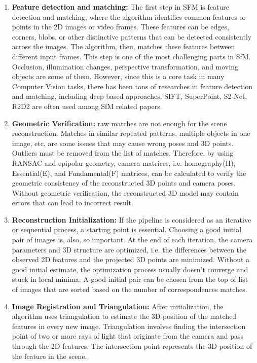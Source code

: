\documentclass[11pt]{article}
\begin{document}
    \begin{enumerate}
        \item \textbf{Feature detection and matching:} The first step in SFM is feature detection and matching, where
        the algorithm identifies common features or points in the 2D images or video frames. These features
        can be edges, corners, blobs, or other distinctive patterns that can be detected consistently across
        the images. The algorithm, then, matches these features between different input frames. This step is one
        of the most challenging parts in SfM. Occlusion, illumination changes, perspective transformation, and moving objects
        are some of them. However, since this is a core task in many Computer Vision tasks, there has been
        tons of researches in feature detection and matching, including deep based approaches. SIFT, SuperPoint,
        S2-Net, R2D2 are often used among SfM related papers.

        \item \textbf{Geometric Verification:} raw matches are not enough for the scene reconstruction.
        Matches in similar repeated patterns, multiple objects in one image, etc, are some issues that may cause wrong
        poses and 3D points. Outliers must be removed from the list of matches. Therefore, by using RANSAC and epipolar
        geometry, camera matrices, i.e. homography(H), Essential(E), and Fundamental(F) matrices, can be calculated
        to verify the geometric consistency of the reconstructed 3D points and camera poses.
        Without geometric verification, the reconstructed 3D model may contain errors that can lead to incorrect result.

        \item \textbf{Reconstruction Initialization:} If the pipeline is considered as an iterative or sequential process,
        a starting point is essential. Choosing a good initial pair of images is, also, so important. At the end of
        each iteration, the camera parameters and 3D structure are optimized, i.e. the differences between
        the observed 2D features and the projected 3D points are minimized. Without a good initial estimate,
        the optimization process usually doesn't converge and stuck in local minima. A good initial pair can be
        chosen from the top of list of images that are sorted based on the number of correspondences matches.

        \item \textbf{Image Registration and Triangulation:} After initialization, the algorithm uses triangulation to estimate
        the 3D position of the matched features in every new image. Triangulation involves finding the intersection point
        of two or more rays of light that originate from the camera and pass through the 2D features. The intersection
        point represents the 3D position of the feature in the scene.


\end{enumerate}
\end{document}
